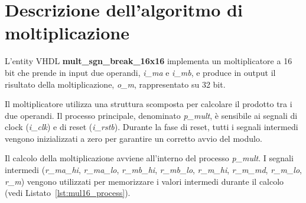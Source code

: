 \documentclass[titlepage]{report}
\begin{document}
	\section{Descrizione dell'algoritmo di moltiplicazione}
	\label{sec:algoritmo_moltiplicazione}
		L'entity VHDL \textbf{mult\_sgn\_break\_16x16} implementa un moltiplicatore a 16 bit che prende in input due operandi, \textit{i\_ma} e \textit{i\_mb}, e produce in output il risultato della moltiplicazione, \textit{o\_m}, rappresentato su 32 bit.

		Il moltiplicatore utilizza una struttura scomposta per calcolare il prodotto tra i due operandi. Il processo principale, denominato \textit{p\_mult}, è sensibile ai segnali di clock (\textit{i\_clk}) e di reset (\textit{i\_rstb}). Durante la fase di reset, tutti i segnali intermedi vengono inizializzati a zero per garantire un corretto avvio del modulo.
		
		Il calcolo della moltiplicazione avviene all'interno del processo \textit{p\_mult}. I segnali intermedi (\textit{r\_ma\_hi}, \textit{r\_ma\_lo}, \textit{r\_mb\_hi}, \textit{r\_mb\_lo}, \textit{r\_m\_hi}, \textit{r\_m\_md}, \textit{r\_m\_lo}, \textit{r\_m}) vengono utilizzati per memorizzare i valori intermedi durante il calcolo (vedi Listato~\ref{lst:mul16_process}).
		
\end{document}
